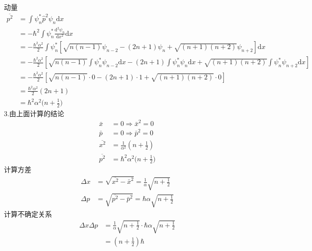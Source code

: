 动量
\begin{equation}
    \begin{aligned}
        \overline{p^2}&=\int{\psi _{n}^{*}\hat{p}^2\psi _n\mathrm{d}x}
\\
&=-\hbar ^2\int{\psi _{n}^{*}\frac{\mathrm{d}^2\psi _n}{\mathrm{d}x^2}\mathrm{d}x}
\\
&=-\frac{\hbar ^2\alpha ^2}{2}\int{\psi _{n}^{*}\left[ \sqrt{n\left( n-1 \right)}\psi _{n-2}-\left( 2n+1 \right) \psi _n+\sqrt{\left( n+1 \right) \left( n+2 \right)}\psi _{n+2} \right] \mathrm{d}x}
\\
&=-\frac{\hbar ^2\alpha ^2}{2}\left[ \sqrt{n\left( n-1 \right)}\int{\psi _{n}^{*}\psi _{n-2}\mathrm{d}x}-\left( 2n+1 \right) \int{\psi _{n}^{*}\psi _n\mathrm{d}x}+\sqrt{\left( n+1 \right) \left( n+2 \right)}\int{\psi _{n}^{*}\psi _{n+2}\mathrm{d}x} \right] 
\\
&=-\frac{\hbar ^2\alpha ^2}{2}\left[ \sqrt{n\left( n-1 \right)}\cdot 0-\left( 2n+1 \right) \cdot 1+\sqrt{\left( n+1 \right) \left( n+2 \right)}\cdot 0 \right] 
\\
&=\frac{\hbar ^2\alpha ^2}{2}\left( 2n+1 \right) 
\\
&=\hbar ^2\alpha ^2\biggl( n+\frac{1}{2} \biggr) 
    \end{aligned}
\end{equation}
3.由上面计算的结论
\begin{equation}
    \begin{aligned}
        \bar{x}&=0\Rightarrow \bar{x}^2=0
\\
\bar{p}&=0\Rightarrow \bar{p}^2=0
\\
\overline{x^2}&=\frac{1}{\alpha ^2}\left( n+\frac{1}{2} \right) 
\\
\overline{p^2}&=\hbar ^2\alpha ^2\biggl( n+\frac{1}{2} \biggr) 
    \end{aligned}
\end{equation}
计算方差
\begin{equation}
    \begin{aligned}
        \Delta x&=\sqrt{\overline{x^2}-\bar{x}^2}=\frac{1}{\alpha}\sqrt{n+\frac{1}{2}}
\\
\Delta p&=\sqrt{\overline{p^2}-\bar{p}^2}=\hbar \alpha \sqrt{n+\frac{1}{2}}
    \end{aligned}
\end{equation}
计算不确定关系
\begin{equation}
    \begin{aligned}
        \Delta x\Delta p&=\frac{1}{\alpha}\sqrt{n+\frac{1}{2}}\cdot \hbar \alpha \sqrt{n+\frac{1}{2}}
\\
&=\left( n+\frac{1}{2} \right) \hbar 
    \end{aligned}
\end{equation}




